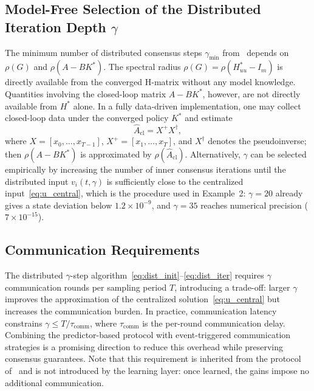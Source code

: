 \documentclass[12pt]{elsarticle}
\theoremstyle{remark}
\begin{document}
\subsection{Model-Free Selection of the Distributed Iteration Depth $\gamma$}
\label{subsec:gamma}
The minimum number of distributed consensus steps $\gamma_{\min}$ from~\cite[Thm.~3.4]{cacace2024} depends on $\rho(G)$ and $\rho(A - BK^*)$. The spectral radius $\rho(G) = \rho(H_{uu}^* - I_m)$ is directly available from the converged H-matrix without any model knowledge. Quantities involving the closed-loop matrix $A - BK^*$, however, are not directly available from $H^*$ alone. In a fully data-driven implementation, one may collect closed-loop data under the converged policy $K^*$ and estimate
\begin{equation}
\hat{A}_{\mathrm{cl}} = X^+ X^\dagger,
\label{eq:Acl}
\end{equation}
where $X = [x_0, \ldots, x_{T-1}]$, $X^+ = [x_1, \ldots, x_T]$, and $X^\dagger$ denotes the pseudoinverse; then $\rho(A - BK^*)$ is approximated by $\rho(\hat{A}_{\mathrm{cl}})$. Alternatively, $\gamma$ can be selected empirically by increasing the number of inner consensus iterations until the distributed input $v_i(t,\gamma)$ is sufficiently close to the centralized input~\eqref{eq:u_central}, which is the procedure used in Example~2: $\gamma = 20$ already gives a state deviation below $1.2\times10^{-9}$, and $\gamma = 35$ reaches numerical precision ($7\times10^{-15}$).
\subsection{Communication Requirements}
\label{subsec:communication}
The distributed $\gamma$-step algorithm~\eqref{eq:dist_init}--\eqref{eq:dist_iter} requires $\gamma$ communication rounds per sampling period $T$, introducing a trade-off: larger $\gamma$ improves the approximation of the centralized solution~\eqref{eq:u_central} but increases the communication burden. In practice, communication latency constrains $\gamma \leq T / \tau_{\mathrm{comm}}$, where $\tau_{\mathrm{comm}}$ is the per-round communication delay. Combining the predictor-based protocol with event-triggered communication strategies is a promising direction to reduce this overhead while preserving consensus guarantees. Note that this requirement is inherited from the protocol of~\cite{cacace2024} and is not introduced by the learning layer: once learned, the gains impose no additional communication.
\end{document}
